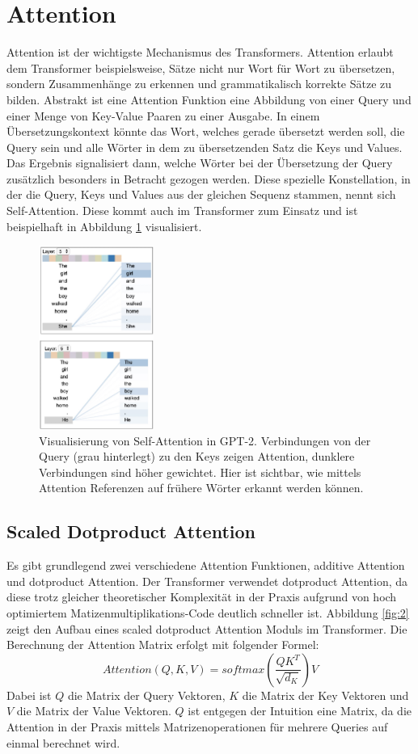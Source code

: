 \documentclass[conference]{IEEEtran}
\begin{document}
\section{Attention}
Attention ist der wichtigste Mechanismus des Transformers. Attention erlaubt dem Transformer beispielsweise, Sätze nicht nur Wort für Wort zu übersetzen, sondern Zusammenhänge zu erkennen und grammatikalisch korrekte Sätze zu bilden. Abstrakt ist eine Attention Funktion eine Abbildung von einer Query und einer Menge von Key-Value Paaren zu einer Ausgabe. In einem Übersetzungskontext könnte das Wort, welches gerade übersetzt werden soll, die Query sein und alle Wörter in dem zu übersetzenden Satz die Keys und Values. Das Ergebnis signalisiert dann, welche Wörter bei der Übersetzung der Query zusätzlich besonders in Betracht gezogen werden. Diese spezielle Konstellation, in der die Query, Keys und Values aus der gleichen Sequenz stammen, nennt sich Self-Attention. Diese kommt auch im Transformer zum Einsatz und ist beispielhaft in Abbildung \ref{fig:4} visualisiert.
\begin{figure}[htbp]
\centerline{\includegraphics[height=6cm]{img/attention_visualized.png}}
\caption{Visualisierung von Self-Attention in GPT-2. Verbindungen von der Query (grau hinterlegt) zu den Keys zeigen Attention, dunklere Verbindungen sind höher gewichtet. Hier ist sichtbar, wie mittels Attention Referenzen auf frühere Wörter erkannt werden können. \cite{visualization_of_attention}}
\label{fig:4}
\end{figure}

\subsection{Scaled Dotproduct Attention}
Es gibt grundlegend zwei verschiedene Attention Funktionen, additive Attention und dotproduct Attention. Der Transformer verwendet dotproduct Attention, da diese trotz gleicher theoretischer Komplexität in der Praxis aufgrund von hoch optimiertem Matizenmultiplikations-Code deutlich schneller ist. Abbildung \ref{fig:2} zeigt den Aufbau eines scaled dotproduct Attention Moduls im Transformer. Die Berechnung der Attention Matrix erfolgt mit folgender Formel:
\begin{equation} \label{eq:attention}
    Attention(Q,K,V) = softmax(\frac{QK^T}{\sqrt{d_K}})V
\end{equation}
Dabei ist $Q$ die Matrix der Query Vektoren, $K$ die Matrix der Key Vektoren und $V$ die Matrix der Value Vektoren. $Q$ ist entgegen der Intuition eine Matrix, da die Attention in der Praxis mittels Matrizenoperationen für mehrere Queries auf einmal berechnet wird.
\end{document}
